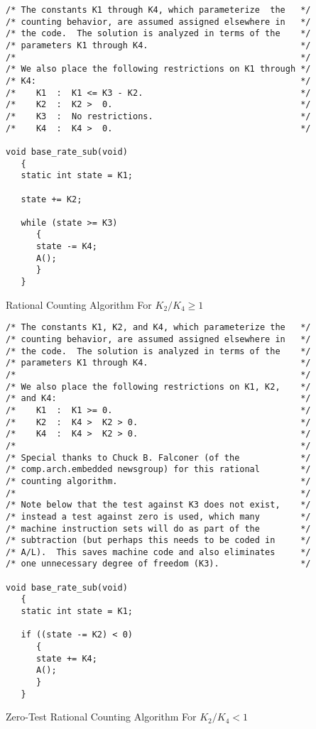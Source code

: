 \begin{algorithm}
\begin{verbatim}
/* The constants K1 through K4, which parameterize  the   */
/* counting behavior, are assumed assigned elsewhere in   */
/* the code.  The solution is analyzed in terms of the    */
/* parameters K1 through K4.                              */
/*                                                        */
/* We also place the following restrictions on K1 through */
/* K4:                                                    */
/*    K1  :  K1 <= K3 - K2.                               */
/*    K2  :  K2 >  0.                                     */
/*    K3  :  No restrictions.                             */
/*    K4  :  K4 >  0.                                     */

void base_rate_sub(void)
   {
   static int state = K1;

   state += K2;                          

   while (state >= K3)  
      {
      state -= K4;
      A();
      }
   }
\end{verbatim}
\caption{Rational Counting Algorithm For $K_2/K_4 \geq 1$}
\label{alg:crat0:sfdv0:01b}
\end{algorithm}

\begin{algorithm}
\begin{verbatim}
/* The constants K1, K2, and K4, which parameterize the   */
/* counting behavior, are assumed assigned elsewhere in   */
/* the code.  The solution is analyzed in terms of the    */
/* parameters K1 through K4.                              */
/*                                                        */
/* We also place the following restrictions on K1, K2,    */
/* and K4:                                                */
/*    K1  :  K1 >= 0.                                     */
/*    K2  :  K4 >  K2 > 0.                                */
/*    K4  :  K4 >  K2 > 0.                                */
/*                                                        */
/* Special thanks to Chuck B. Falconer (of the            */
/* comp.arch.embedded newsgroup) for this rational        */
/* counting algorithm.                                    */
/*                                                        */
/* Note below that the test against K3 does not exist,    */
/* instead a test against zero is used, which many        */
/* machine instruction sets will do as part of the        */
/* subtraction (but perhaps this needs to be coded in     */
/* A/L).  This saves machine code and also eliminates     */
/* one unnecessary degree of freedom (K3).                */

void base_rate_sub(void)
   {
   static int state = K1;

   if ((state -= K2) < 0)
      {
      state += K4;
      A();
      }
   }
\end{verbatim}
\caption{Zero-Test Rational Counting Algorithm For $K_2/K_4 < 1$}
\label{alg:crat0:sfdv0:01c}
\end{algorithm}

